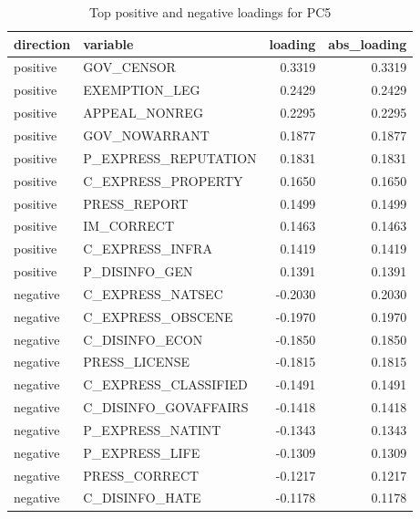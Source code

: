 \begin{table}
\caption{Top positive and negative loadings for PC5}
\label{tab:pc5_loadings}
\begin{tabular}{llrr}
\toprule
direction & variable & loading & abs_loading \\
\midrule
positive & GOV_CENSOR & 0.3319 & 0.3319 \\
positive & EXEMPTION_LEG & 0.2429 & 0.2429 \\
positive & APPEAL_NONREG & 0.2295 & 0.2295 \\
positive & GOV_NOWARRANT & 0.1877 & 0.1877 \\
positive & P_EXPRESS_REPUTATION & 0.1831 & 0.1831 \\
positive & C_EXPRESS_PROPERTY & 0.1650 & 0.1650 \\
positive & PRESS_REPORT & 0.1499 & 0.1499 \\
positive & IM_CORRECT & 0.1463 & 0.1463 \\
positive & C_EXPRESS_INFRA & 0.1419 & 0.1419 \\
positive & P_DISINFO_GEN & 0.1391 & 0.1391 \\
negative & C_EXPRESS_NATSEC & -0.2030 & 0.2030 \\
negative & C_EXPRESS_OBSCENE & -0.1970 & 0.1970 \\
negative & C_DISINFO_ECON & -0.1850 & 0.1850 \\
negative & PRESS_LICENSE & -0.1815 & 0.1815 \\
negative & C_EXPRESS_CLASSIFIED & -0.1491 & 0.1491 \\
negative & C_DISINFO_GOVAFFAIRS & -0.1418 & 0.1418 \\
negative & P_EXPRESS_NATINT & -0.1343 & 0.1343 \\
negative & P_EXPRESS_LIFE & -0.1309 & 0.1309 \\
negative & PRESS_CORRECT & -0.1217 & 0.1217 \\
negative & C_DISINFO_HATE & -0.1178 & 0.1178 \\
\bottomrule
\end{tabular}
\end{table}
